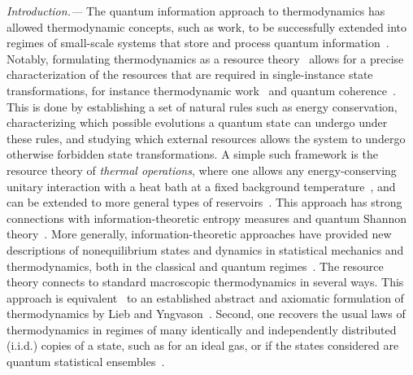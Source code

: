 \documentclass[prl,reprint,longbibliography,superscriptaddress]{revtex4-1}
\renewcommand\paragraph[1]{%
  \par\emph{#1.---}\kern2pt\relax\ignorespaces}
\begin{document}
\paragraph{Introduction}%
The quantum information approach to thermodynamics has allowed thermodynamic
concepts, such as work, to be successfully extended into regimes of small-scale
systems that store and process quantum information~\cite{Goold2016JPA_review}.
%
Notably, formulating thermodynamics as a resource
theory~\cite{Janzing2000_cost,%
  Horodecki2003PRA_NoisyOps,%
  Brandao2013_resource,%
  Chitambar2018arXiv_resource} allows for a precise characterization of the
resources that are required in single-instance state transformations, for
instance thermodynamic work~\cite{Dahlsten2011NJP_inadequacy,%
  Aberg2013_worklike,Horodecki2013_ThermoMaj} and quantum
coherence~\cite{Lostaglio2015NC_beyond,Korzekwa2016NJP_extraction,%
  Gour2017arXiv_entropic,Marvian2018arXiv_distillation}.  This is done by
establishing a set of natural rules such as energy conservation, characterizing
which possible evolutions a quantum state can undergo under these rules, and
studying which external resources allows the system to undergo otherwise
forbidden state transformations.
%
A simple such framework is the resource theory of \emph{thermal operations},
where one allows any energy-conserving unitary interaction with a heat bath at a
fixed background temperature~\cite{Brandao2013_resource,%
  Horodecki2013_ThermoMaj,Brandao2015PNAS_secondlaws}, and can be extended to
more general types of reservoirs~\cite{YungerHalpern2016PRE_beyond,%
  Guryanova2016NatComm_multiple,%
  YungerHalpern2016NatComm_NATSandNATO,%
  HindsMingo2018arXiv_multiple}.  This approach has strong connections with
information-theoretic entropy measures and quantum Shannon
theory~\cite{Faist2015NatComm,Chubb2017arXiv_beyond}.  More generally,
information-theoretic approaches have provided new descriptions of
nonequilibrium states and dynamics in statistical mechanics and thermodynamics,
both in the classical and quantum regimes~\cite{Esposito2009,%
  Sagawa2012,Seifert2012,Parrondo2015,Tajima2016arXiv_large}.
%
The resource theory connects to standard macroscopic thermodynamics in several
ways.  This approach is equivalent~\cite{Weilenmann2016PRL_axiomatic,%
  PhDMirjam2017,Weilenmann2018arXiv_smooth} to an established abstract and
axiomatic formulation of thermodynamics by Lieb and
Yngvason~\cite{Lieb1999_secondlaw,Lieb2004_guide_secondlaw,%
  Lieb2013_entropy_noneq,Lieb2014PRSA_meter}.  Second, one recovers the usual
laws of thermodynamics in regimes of many identically and independently
distributed (i.i.d.\@) copies of a state, such as for an ideal gas, or if the
states considered are quantum statistical
ensembles~\cite{Brandao2013_resource,Horodecki2013_ThermoMaj,%
  Matsumoto2010arXiv_reverse,Jiao2018JMP_convertibility,%
  Faist2018PRX_workcost}.
\end{document}
